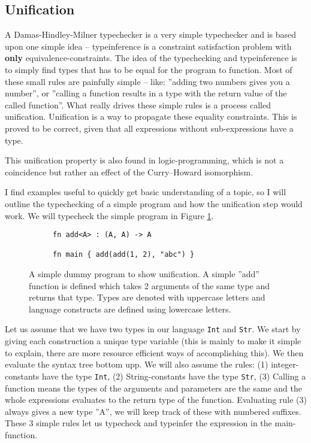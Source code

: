 \subsection{Unification}
A Damas-Hindley-Milner typechecker is a very simple typechecker and is based upon one simple idea -- typeinference is a constraint satisfaction problem with \textbf{only} equivalence-constraints. The idea of the typechecking and typeinference is to simply find types that has to be equal for the program to function. Most of these small rules are painfully simple -- like: ''adding two numbers gives you a number'', or ''calling a function results in a type with the return value of the called function''. What really drives these simple rules is a process called unification. Unification is a way to propagate these equality constraints. This is proved to be correct, given that all expressions without sub-expressions have a type.

This unification property is also found in logic-programming, which is not a coincidence but rather an effect of the Curry–Howard isomorphism. \cite{src:curryHowardIso}

I find examples useful to quickly get basic understanding of a topic, so I will outline the typechecking of a simple program and how the unification step would work. We will typecheck the simple program in Figure \ref{fig:progUni}.

\begin{figure}
\centering
  \begin{subfigure}{.5\textwidth}
\begin{verbatim}
fn add<A> : (A, A) -> A

fn main { add(add(1, 2), "abc") }
\end{verbatim}
  \end{subfigure}
  \caption{A simple dummy program to show unification. A simple ''add'' function is defined which takes 2 arguments of the same type and returns that type. Types are denoted with uppercase letters and language constructs are defined using lowercase letters.}
  \label{fig:progUni}
\end{figure}

Let us assume that we have two types in our language \verb+Int+ and \verb+Str+. We start by giving each construction a unique type variable (this is mainly to make it simple to explain, there are more resource efficient ways of accomplishing this). We then evaluate the syntax tree bottom upp. We will also assume the rules: (1) integer-constants have the type \verb+Int+, (2) String-constants have the type \verb+Str+, (3) Calling a function means the types of the arguments and parameters are the same and the whole expressions evaluates to the return type of the function. Evaluating rule (3) always gives a new type ''A'', we will keep track of these with numbered suffixes. These 3 simple rules let us typecheck and typeinfer the expression in the main-function.

